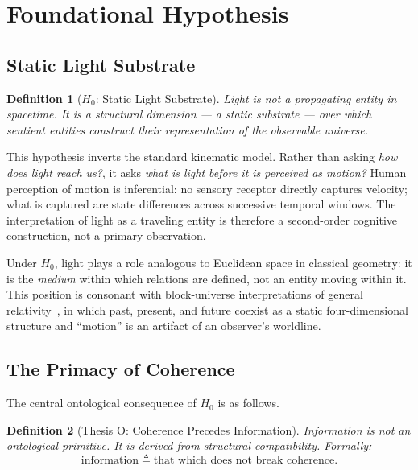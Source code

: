 \documentclass{article}
\newtheorem{definition}{Definition}
\begin{document}
\section{Foundational Hypothesis}
\label{sec:hypothesis}

\subsection{Static Light Substrate}

\begin{definition}[$H_0$: Static Light Substrate]
Light is not a propagating entity in spacetime.  It is a structural dimension
--- a static substrate --- over which sentient entities construct their
representation of the observable universe.
\end{definition}

This hypothesis inverts the standard kinematic model.  Rather than asking
\emph{how does light reach us?}, it asks \emph{what is light before it is
perceived as motion?}  Human perception of motion is inferential: no sensory
receptor directly captures velocity; what is captured are state differences
across successive temporal windows.  The interpretation of light as a traveling
entity is therefore a second-order cognitive construction, not a primary
observation.

Under $H_0$, light plays a role analogous to Euclidean space in classical
geometry: it is the \emph{medium} within which relations are defined, not an
entity moving within it.  This position is consonant with block-universe
interpretations of general relativity~\cite{minkowski1908}, in which past,
present, and future coexist as a static four-dimensional structure and
``motion'' is an artifact of an observer's worldline.

\subsection{The Primacy of Coherence}

The central ontological consequence of $H_0$ is as follows.

\begin{definition}[Thesis O: Coherence Precedes Information]
Information is not an ontological primitive.  It is derived from structural
compatibility.  Formally:
\[
  \text{information} \;\triangleq\; \text{that which does not break coherence.}
\]
\end{definition}
\end{document}
